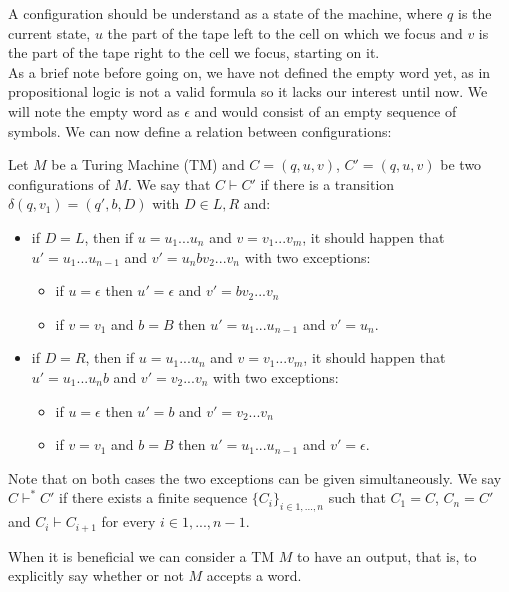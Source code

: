 A configuration should be understand as a state of the machine, where $q$ is the current state, $u$ the part of the tape left to the cell on which we focus and $v$ is the part of the tape right to the cell we focus, starting on it.\\

As a brief note before going on, we have not defined the empty word yet, as in propositional logic is not a valid formula so it lacks our interest until now. We will note the empty word as $\epsilon$ and would consist of an empty sequence of symbols. We can  now define a relation between configurations:

\begin{definition}\label{def:paso}
  Let $M$ be a Turing Machine (TM) and $C=(q,u,v)$, $C'=(q,u,v)$ be two configurations of $M$. We say that $C\vdash C'$ if there is a transition $\delta (q,v_1) = (q', b, D) $ with $D\in{L,R}$ and:
  \begin{itemize}
  \item if $D=L$, then if $u=u_1...u_n$ and $v = v_1...v_m$, it should happen that $u' = u_1...u_{n-1}$ and $v' = u_n bv_2...v_n$ with two exceptions:
    \begin{itemize}
    \item if $u=\epsilon$ then $u' = \epsilon$ and $v' = bv_2...v_n$
    \item if $v = v_1$ and $b =B$ then $u'=u_1...u_{n-1}$ and $v' = u_n$.
    \end{itemize}

  \item if $D=R$, then if $u=u_1...u_n$ and $v = v_1...v_m$, it should happen that $u' = u_1...u_{n}b$ and $v' = v_2...v_n$ with two exceptions:
    \begin{itemize}
    \item if $u=\epsilon$ then $u' = b$ and $v' =v_2...v_n$
    \item if $v = v_1$ and $b =B$ then $u'=u_1...u_{n-1}$ and $v' = \epsilon$.
    \end{itemize}
  \end{itemize}

  Note that on both cases the two exceptions can be given simultaneously. We say $C\vdash^* C'$ if there exists a finite sequence $\{C_i\}_{i\in 1,...,n}$ such that $C_1 = C$, $C_n=C'$ and $C_i\vdash C_{i+1}$ for every $i\in 1,...,n-1$.  
  \end{definition}

  When it is beneficial we can consider a TM $M$ to have an output, that is, to explicitly say whether or not $M$ accepts a word.\\

